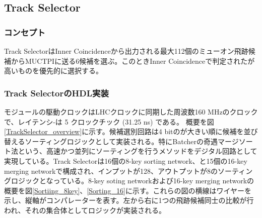 \subsection{Track Selector}
\subsubsection*{コンセプト}
Track SelectorはInner Coincidenceから出力される最大112個のミューオン飛跡候補からMUCTPIに送る6候補を選ぶ。このときInner Coincidenceで判定された\pt が高いものを優先的に選択する。

\subsubsection*{Track SelectorのHDL実装}
モジュールの駆動クロックはLHCクロックに同期した周波数160 MHzのクロックで、レイテンシ-は 5 クロックチック (31.25 ns) である。
概要を図\ref{TrackSelector_overview}に示す。候補選別回路は4 bitの\pt が大きい順に候補を並び替えるソーティングロジックとして実装される。特にBatcherの奇遇マージソート法\cite{Batcher}という、高速かつ並列にソーティングを行うメソッドをデジタル回路として実現している。Track Selectorは16個の8-key sorting network、と15個の16-key merging networkで構成され、インプットが128、アウトプットが8のソーティングロジックとなっている。8-key soting networkおよび16-key merging networkの概要を図\ref{Sortiing_8key}、\ref{Sorting_16}に示す。これらの図の横線はワイヤーを示し、縦軸がコンパレーターを表す。左から右に1つの飛跡候補同士の比較が行われ、それの集合体としてロジックが実装される。


